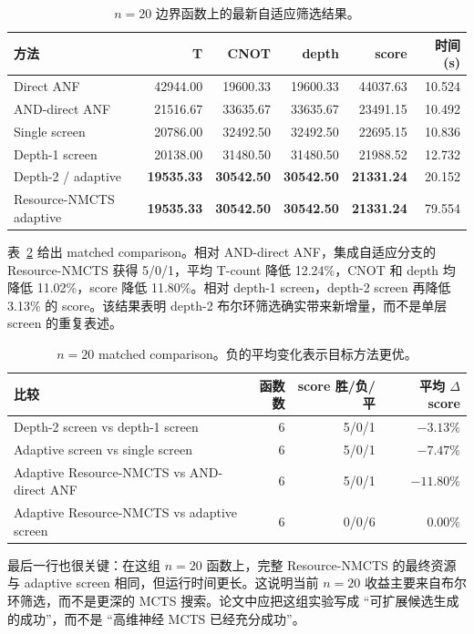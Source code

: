 \documentclass[UTF8,fontset=macnew,11pt]{ctexart}
\newcommand{\method}{Resource-NMCTS}
\begin{document}
\begin{table}[t]
\centering
\scriptsize
\caption{$n=20$ 边界函数上的最新自适应筛选结果。}
\label{tab:n20_summary}
\begin{tabularx}{\linewidth}{>{\raggedright\arraybackslash}Xrrrrr}
\toprule
方法 & T & CNOT & depth & score & 时间(s) \\
\midrule
Direct ANF & 42944.00 & 19600.33 & 19600.33 & 44037.63 & 10.524 \\
AND-direct ANF & 21516.67 & 33635.67 & 33635.67 & 23491.15 & 10.492 \\
Single screen & 20786.00 & 32492.50 & 32492.50 & 22695.15 & 10.836 \\
Depth-1 screen & 20138.00 & 31480.50 & 31480.50 & 21988.52 & 12.732 \\
Depth-2 / adaptive & \textbf{19535.33} & \textbf{30542.50} & \textbf{30542.50} & \textbf{21331.24} & 20.152 \\
\method{} adaptive & \textbf{19535.33} & \textbf{30542.50} & \textbf{30542.50} & \textbf{21331.24} & 79.554 \\
\bottomrule
\end{tabularx}
\end{table}

表~\ref{tab:n20_pair} 给出 matched comparison。相对 AND-direct ANF，集成自适应分支的 \method{} 获得 5/0/1，平均 T-count 降低 12.24\%，CNOT 和 depth 均降低 11.02\%，score 降低 11.80\%。相对 depth-1 screen，depth-2 screen 再降低 3.13\% 的 score。该结果表明 depth-2 布尔环筛选确实带来新增量，而不是单层 screen 的重复表述。

\begin{table}[t]
\centering
\small
\caption{$n=20$ matched comparison。负的平均变化表示目标方法更优。}
\label{tab:n20_pair}
\begin{tabularx}{\linewidth}{>{\raggedright\arraybackslash}Xrrr}
\toprule
比较 & 函数数 & score 胜/负/平 & 平均 $\Delta$ score \\
\midrule
Depth-2 screen vs depth-1 screen & 6 & 5/0/1 & $-3.13\%$ \\
Adaptive screen vs single screen & 6 & 5/0/1 & $-7.47\%$ \\
Adaptive \method{} vs AND-direct ANF & 6 & 5/0/1 & $-11.80\%$ \\
Adaptive \method{} vs adaptive screen & 6 & 0/0/6 & $0.00\%$ \\
\bottomrule
\end{tabularx}
\end{table}

最后一行也很关键：在这组 $n=20$ 函数上，完整 \method{} 的最终资源与 adaptive screen 相同，但运行时间更长。这说明当前 $n=20$ 收益主要来自布尔环筛选，而不是更深的 MCTS 搜索。论文中应把这组实验写成 ``可扩展候选生成的成功''，而不是 ``高维神经 MCTS 已经充分成功''。
\end{document}
